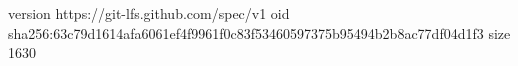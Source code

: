 version https://git-lfs.github.com/spec/v1
oid sha256:63c79d1614afa6061ef4f9961f0c83f53460597375b95494b2b8ac77df04d1f3
size 1630
